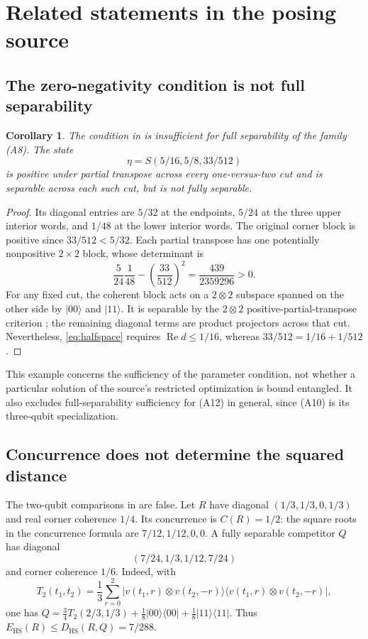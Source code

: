 \documentclass[11pt]{article}
\newtheorem{corollary}[theorem]{Corollary}
\newcommand{\ket}[1]{\lvert #1\rangle}
\newcommand{\bra}[1]{\langle #1\rvert}
\newcommand{\proj}[1]{\ket{#1}\!\bra{#1}}
\newcommand{\Rea}{\operatorname{Re}}
\newcommand{\E}{E_{\mathrm{HS}}}
\newcommand{\D}{D_{\mathrm{HS}}}
\begin{document}
\section{Related statements in the posing source}
\subsection{The zero-negativity condition is not full separability}
\begin{corollary}\label{cor:ppt}
The condition in \cite[Eq.~(A10)]{CAW} is insufficient for full separability
of the family (A8). The state
\[
 \eta=S(5/16,5/8,33/512)
\]
is positive under partial transpose across every one-versus-two cut and is
separable across each such cut, but is not fully separable.
\end{corollary}
\begin{proof}
Its diagonal entries are $5/32$ at the endpoints, $5/24$ at the three
upper interior words, and $1/48$ at the lower interior words.
The original corner block is positive since $33/512<5/32$.
Each partial transpose has one potentially nonpositive $2\times2$ block,
whose determinant is
\[
 \frac5{24}\frac1{48}-\left(\frac{33}{512}\right)^2
 =\frac{439}{2359296}>0.
\]
For any fixed cut, the coherent block acts on a $2\otimes2$ subspace
spanned on the other side by $\ket{00}$ and $\ket{11}$.
It is separable by the $2\otimes2$ positive-partial-transpose criterion
\cite{HHH}; the remaining diagonal terms are product projectors across that
cut. Nevertheless, \eqref{eq:halfspace} requires
$\Rea d\le1/16$, whereas $33/512=1/16+1/512$.
\end{proof}
This example concerns the sufficiency of the parameter condition, not
whether a particular solution of the source's restricted optimization is
bound entangled. It also excludes full-separability sufficiency for (A12)
in general, since (A10) is its three-qubit specialization.

\subsection{Concurrence does not determine the squared distance}
The two-qubit comparisons in \cite[Eqs.~(17)--(18)]{CAW} are false.
Let $R$ have diagonal $(1/3,1/3,0,1/3)$ and real corner coherence $1/4$.
Its concurrence is $C(R)=1/2$: the square roots in the concurrence formula
\cite{Wootters} are $7/12,1/12,0,0$.
A fully separable competitor $Q$ has diagonal
\[
 (7/24,1/3,1/12,7/24)
\]
and corner coherence $1/6$.
Indeed, with
\[
 T_2(t_1,t_2)=\frac13\sum_{r=0}^2
 \proj{v(t_1,r)\otimes v(t_2,-r)},
\]
one has $Q=\frac34T_2(2/3,1/3)+\frac18\proj{00}+\frac18\proj{11}$.
Thus $\E(R)\le\D(R,Q)=7/288$.
\end{document}
